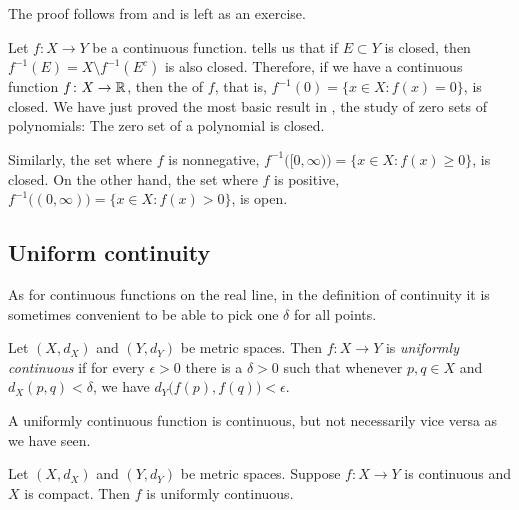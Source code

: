 The proof follows from  and is left as
an exercise.

\begin{example}
Let $f \colon X \to Y$ be a continuous function.
 tells us that if $E \subset Y$ is closed, then 
$f^{-1}(E) = X \setminus f^{-1}(E^c)$ is also closed.  Therefore, if
we have a continuous
function $f \colon X \to {\mathbb{R}}$, then the
\emph{} of $f$, that is, 
$f^{-1}(0) = \bigl\{ x \in X : f(x) = 0 \bigr\}$, is closed.
We have just proved the most basic result in
\emph{}, the study of
zero sets of polynomials:  The zero set of a polynomial is closed.

Similarly, the set where $f$ is nonnegative,
$f^{-1}\bigl( [0,\infty) \bigr) = \bigl\{ x \in X : f(x) \geq 0 \bigr\}$,
is closed.  On the other hand, the
set where $f$ is positive,
$f^{-1}\bigl( (0,\infty) \bigr) = \bigl\{ x \in X : f(x) > 0 \bigr\}$,
is open.  
\end{example}

\subsection{Uniform continuity}

As for continuous
functions on the real line, in the definition of continuity
it is sometimes convenient to be able to pick
one $\delta$ for all points.

\begin{defn}
Let $(X,d_X)$ and $(Y,d_Y)$ be metric spaces.
Then $f \colon X \to Y$ is
\emph{uniformly continuous}
if for every $\epsilon > 0$
there is a $\delta > 0$ such that whenever $p,q \in X$ and $d_X(p,q) <
\delta$, we have
$d_Y\bigl(f(p),f(q)\bigr) < \epsilon$.
\end{defn}

A uniformly continuous function is continuous, but not necessarily
vice versa as we have seen.

\begin{thm} \label{thm:Xcompactfunifcont}
Let $(X,d_X)$ and $(Y,d_Y)$ be metric spaces.
Suppose $f \colon X \to Y$ is continuous and $X$ is compact.  Then
$f$ is uniformly continuous.
\end{thm}

